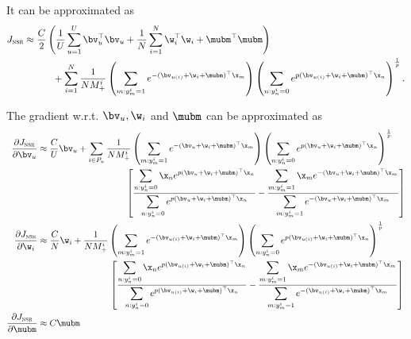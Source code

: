 It can be approximated as
\begin{equation*}
\begin{aligned}
J_\textsc{nsr} 
&\approx \frac{C}{2} \left( \frac{1}{U} \sum_{u=1}^U \bv_u^\top \bv_u + \frac{1}{N} \sum_{i=1}^N \w_i^\top \w_i + \mubm^\top \mubm \right) \\
& \hspace{3em}
  + \sum_{i=1}^N \frac{1}{N M_+^i} 
    \left( \sum_{m: y_m^i = 1} e^{-(\bv_{u(i)} + \w_i + \mubm)^\top \x_m} \right)
    \left( \sum_{n: y_n^i = 0} e^{p (\bv_{u(i)} + \w_i + \mubm)^\top \x_n} \right)^\frac{1}{p}.
\end{aligned}
\end{equation*}

The gradient w.r.t. $\bv_u, \w_i$ and $\mubm$ can be approximated as 
\begin{equation*}
\begin{aligned}
\frac{\partial J_\textsc{nsr}}{\partial \bv_u}
&\approx \frac{C}{U} \bv_u
  + \sum_{i \in P_u} \frac{1}{N M_+^i} 
    \left( \sum_{m: y_m^i = 1} e^{-(\bv_u + \w_i + \mubm)^\top \x_m} \right)
    \left( \sum_{n: y_n^i = 0} e^{p (\bv_u + \w_i + \mubm)^\top \x_n} \right)^\frac{1}{p} \\
& \hspace{9.8em} \left[ 
    \frac{ \displaystyle \sum_{n: y_n^i = 0} \x_n e^{p (\bv_u + \w_i + \mubm)^\top \x_n} }
         { \displaystyle \sum_{n: y_n^i = 0} e^{p (\bv_u + \w_i + \mubm)^\top \x_n} }
    - \frac{ \displaystyle \sum_{m: y_m^i = 1} \x_m e^{-(\bv_u + \w_i + \mubm)^\top \x_m} }
           { \displaystyle \sum_{m: y_m^i = 1} e^{-(\bv_u + \w_i + \mubm)^\top \x_m} } \right] \\
%
\frac{\partial J_\textsc{nsr}}{\partial \w_i}
&\approx \frac{C}{N} \w_i
  + \frac{1}{N M_+^i} 
    \left( \sum_{m: y_m^i = 1} e^{-(\bv_{u(i)} + \w_i + \mubm)^\top \x_m} \right)
    \left( \sum_{n: y_n^i = 0} e^{p (\bv_{u(i)} + \w_i + \mubm)^\top \x_n} \right)^\frac{1}{p} \\
& \hspace{8em} \left[ 
    \frac{ \displaystyle \sum_{n: y_n^i = 0} \x_n e^{p (\bv_{u(i)} + \w_i + \mubm)^\top \x_n} }
         { \displaystyle \sum_{n: y_n^i = 0} e^{p (\bv_{u(i)} + \w_i + \mubm)^\top \x_n} }
    - \frac{ \displaystyle \sum_{m: y_m^i = 1} \x_m e^{-(\bv_{u(i)} + \w_i + \mubm)^\top \x_m} }
           { \displaystyle \sum_{m: y_m^i = 1} e^{-(\bv_{u(i)} + \w_i + \mubm)^\top \x_m} } \right] \\
%
\frac{\partial J_\textsc{nsr}}{\partial \mubm}
&\approx C \mubm

\end{aligned}
\end{equation*}
